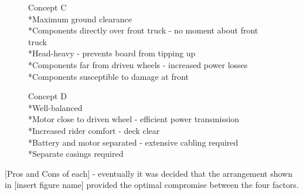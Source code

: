 \documentclass[journal,10pt]{IEEEtran}
\begin{document}
        \begin{figure}[H]
                \centering
                \caption{Concept C
                \\*Maximum ground clearance
                \\*Components directly over front truck - no moment about front truck
                \\*Head-heavy - prevents board from tipping up
                \\*Components far from driven wheels - increased power losses
                \\*Components susceptible to damage at front}
                \label{fig:ConceptC}
            \end{figure} 
        \begin{figure}[H]
                \centering
                \caption{Concept D
                \\*Well-balanced
                \\*Motor close to driven wheel - efficient power transmission
                \\*Increased rider comfort - deck clear
                \\*Battery and motor separated - extensive cabling required
                \\*Separate casings required}
                \label{fig:ConceptD}
            \end{figure} 
        [Pros and Cons of each] - eventually it was decided that the arrangement shown in [insert figure name] provided the optimal compromise between the four factors.
\end{document}
